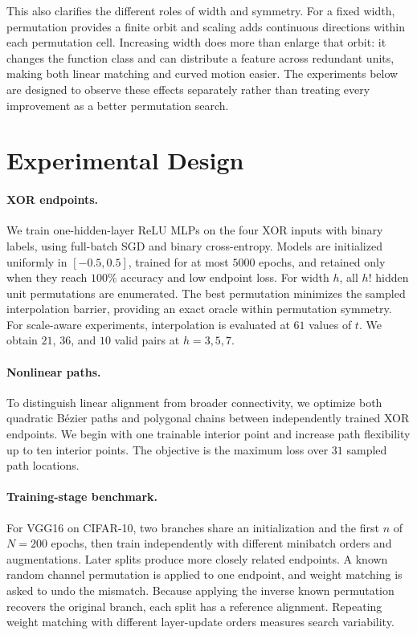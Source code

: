 \documentclass{article}
\begin{document}
This also clarifies the different roles of width and symmetry.  For a fixed
width, permutation provides a finite orbit and scaling adds continuous
directions within each permutation cell.  Increasing width does more than
enlarge that orbit: it changes the function class and can distribute a feature
across redundant units, making both linear matching and curved motion easier.
The experiments below are designed to observe these effects separately rather
than treating every improvement as a better permutation search.

\section{Experimental Design}
\label{sec:design}

\paragraph{XOR endpoints.}
We train one-hidden-layer ReLU MLPs on the four XOR inputs with binary labels,
using full-batch SGD and binary cross-entropy.  Models are initialized uniformly
in $[-0.5,0.5]$, trained for at most $5000$ epochs, and retained only when they
reach $100\%$ accuracy and low endpoint loss.  For width $h$, all $h!$ hidden
unit permutations are enumerated.  The best permutation minimizes the sampled
interpolation barrier, providing an exact oracle within permutation symmetry.
For scale-aware experiments, interpolation is evaluated at $61$ values of $t$.
We obtain $21$, $36$, and $10$ valid pairs at $h=3,5,7$.

\paragraph{Nonlinear paths.}
To distinguish linear alignment from broader connectivity, we optimize both
quadratic B\'ezier paths and polygonal chains between independently trained XOR
endpoints.  We begin with one trainable interior point and increase path
flexibility up to ten interior points.  The objective is the maximum loss over
$31$ sampled path locations.

\paragraph{Training-stage benchmark.}
For VGG16 on CIFAR-10, two branches share an initialization and the first $n$
of $N=200$ epochs, then train independently with different minibatch orders and
augmentations.  Later splits produce more closely related endpoints.  A known
random channel permutation is applied to one endpoint, and weight matching is
asked to undo the mismatch.  Because applying the inverse known permutation
recovers the original branch, each split has a reference alignment.  Repeating
weight matching with different layer-update orders measures search variability.
\end{document}
